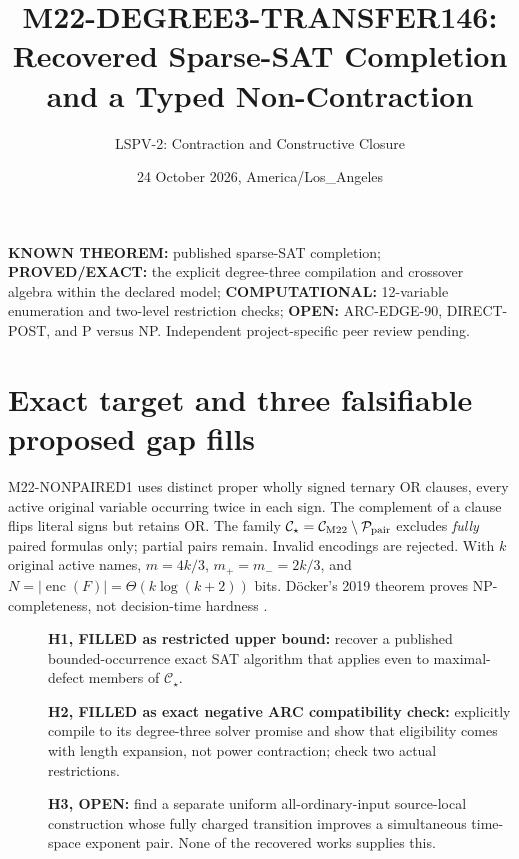\documentclass[11pt]{article}
\title{M22-DEGREE3-TRANSFER146: Recovered Sparse-SAT Completion and a Typed Non-Contraction}
\author{LSPV-2: Contraction and Constructive Closure}
\date{24 October 2026, America/Los\_Angeles}
\newcommand{\CS}{\mathcal C_\star}
\begin{document}
\maketitle
\noindent\textbf{KNOWN THEOREM:} published sparse-SAT completion; \textbf{PROVED/EXACT:} the explicit degree-three compilation and crossover algebra within the declared model; \textbf{COMPUTATIONAL:} 12-variable enumeration and two-level restriction checks; \textbf{OPEN:} ARC-EDGE-90, DIRECT-POST, and P versus NP. Independent project-specific peer review pending.

\section{Exact target and three falsifiable proposed gap fills}
M22-NONPAIRED1 uses distinct proper wholly signed ternary OR clauses, every active original variable occurring twice in each sign. The complement of a clause flips literal signs but retains OR. The family \(\CS=\mathcal C_{\rm M22}\setminus\mathcal P_{\rm pair}\) excludes \emph{fully} paired formulas only; partial pairs remain. Invalid encodings are rejected. With \(k\) original active names, \(m=4k/3\), \(m_+=m_-=2k/3\), and \(N=\lvert\operatorname{enc}(F)\rvert=\Theta(k\log(k+2))\) bits. D\"ocker's 2019 theorem proves NP-completeness, not decision-time hardness \cite{docker}.

\begin{description}
\item[] \textbf{H1, FILLED as restricted upper bound:} recover a published bounded-occurrence exact SAT algorithm that applies even to maximal-defect members of \(\CS\).
\item[] \textbf{H2, FILLED as exact negative ARC compatibility check:} explicitly compile to its degree-three solver promise and show that eligibility comes with length expansion, not power contraction; check two actual restrictions.
\item[] \textbf{H3, OPEN:} find a separate uniform all-ordinary-input source-local construction whose fully charged transition improves a simultaneous time-space exponent pair. None of the recovered works supplies this.
\end{description}
\end{document}
